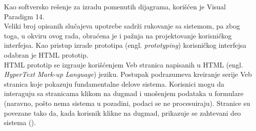 Kao softversko re\v senje za izradu pomenutih dijagrama, kori\v s\' cen je Visual Paradigm 14.\\

Veliki broj opisanih slu\v cajeva upotrebe sadr\v zi rukovanje sa sistemom, pa zbog toga, u okviru ovog rada, obra\' cena je i pa\v znja na projektovanje korisni\v ckog interfejsa. Kao pristup izrade prototipa (engl. \textit{prototyping}) korisni\v ckog interfejsa odabran je HTML prototip.\\

HTML prototip se izgra\dj uje kori\v s\'cenjem Veb stranica napisanih u HTML (engl. \textit{HyperText Mark-up Language}) jeziku. Postupak podrazumeva kreiranje serije Veb stranica koje pokazuju fundamentalne delove sistema. Korisnici mogu da interaguju sa stranicama klikom na dugmad i uno\v senjem podataka u formulare (naravno, po\v sto nema sistema u pozadini, podaci se ne procesuiraju). Stranice su povezane tako da, kada korisnik klikne na dugmad, prikazuje se zahtevani deo sistema (\cite{SAAD}).

\newpage